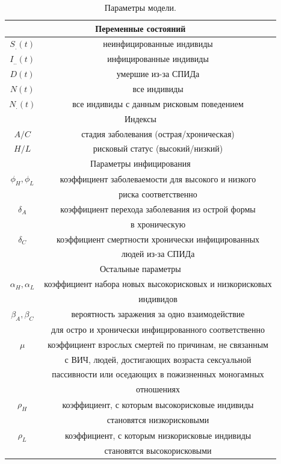 \documentclass[a4paper]{report}
\begin{document}
	\begin{table}
		\begin{center}
			\begin{tabular}{c|c}
			
				\multicolumn{2}{c}{Переменные состояний} \\
				\hline
				$S_.(t)$ & неинфицированные индивиды\\
				$I_{..}(t)$ & инфицированные индивиды \\
				$D(t)$ & умершие из-за СПИДа \\
				$N(t)$ & все индивиды \\
				$N_.(t)$ & все индивиды с данным рисковым поведением \\
				\hline
				
				\multicolumn{2}{c}{Индексы} \\
				\hline
				$A/C$ & стадия заболевания (острая/хроническая)\\
				$H/L$ & рисковый статус (высокий/низкий) \\
				\hline
			
				\multicolumn{2}{c}{Параметры инфицирования} \\
				\hline
				$\phi_H, \phi_L$ & коэффициент заболеваемости для высокого и низкого\\
				& риска соответственно \\
				$\delta_A$ & коэффициент перехода заболевания из острой формы \\
				& в хроническую \\
				$\delta_C$ & коэффициент смертности хронически инфицированных \\
				& людей из-за СПИДа \\
				\hline
				
				\multicolumn{2}{c}{Остальные параметры} \\
				\hline
				$\alpha_H, \alpha_L$ & коэффициент набора новых высокорисковых и низкорисковых \\
				& индивидов \\
				$\beta_A, \beta_C$ & вероятность заражения за одно взаимодействие \\
				& для остро и хронически инфицированного соответственно \\
				$\mu$ & коэффициент взрослых смертей по причинам, не связанным \\
				& с ВИЧ, людей, достигающих возраста сексуальной \\
				& пассивности или оседающих в пожизненных моногамных \\
				&отношениях \\
				$\rho_H$ & коэффициент, с которым высокорисковые индивиды \\
				& становятся низкорисковыми \\
				$\rho_L$ & коэффициент, с которым низкорисковые индивиды \\
				& становятся высокорисковыми \\
				\hline
				
			\end{tabular}
		\end{center}
		\caption{\label{tab:canonsummary}Параметры модели.}
	\end{table}
\end{document}

